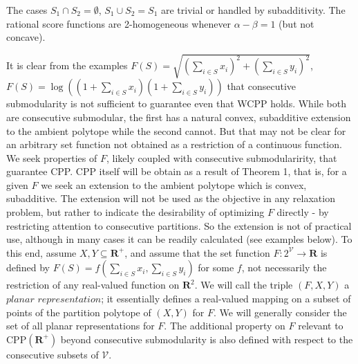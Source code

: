 \documentclass{article}
\theoremstyle{case}
\begin{document}
The cases $S_1 \cap S_2 = \emptyset$, $S_1 \cup S_2 = S_1$ are trivial or handled by subadditivity. The rational score functions are 2-homogeneous whenever $\alpha - \beta = 1$ (but not concave). 

It is clear from the examples $F(S) = \sqrt{(\sum_{i \in S}x_i)^2 + (\sum_{i \in S}y_i)^2}$, $F(S) = \log{((1+\sum_{i \in S}x_i)(1+\sum_{i \in S}y_i))}$ that consecutive submodularity is not sufficient to guarantee even that WCPP holds. While both are consecutive submodular, the first has a natural convex, subadditive extension to the ambient polytope while the second cannot. But that may not be clear for an arbitrary set function not obtained as a restriction of a continuous function. We seek properties of $F$, likely coupled with consecutive submodularirity, that guarantee CPP. CPP itself will be obtain as a result of Theorem 1, that is, for a given $F$ we seek an extension to the ambient polytope which is convex, subadditive. The extension will not be used as the objective in any relaxation problem, but rather to indicate the desirability of optimizing $F$ directly - by restricting attention to consecutive partitions. So the extension is not of practical use, although in many cases it can be readily calculated (see examples below). 
To this end, assume $X, Y \subseteq \mathbf{R}^+$, and assume that the set function $F\colon 2^{\mathcal{V}} \to \mathbf{R}$ is defined by $F(S) = f(\sum_{i \in S}x_i,\sum_{i \in S}y_i)$ for some $f$, not necessarily the restriction of any real-valued function on $\mathbf{R}^2$. We will call the triple $(F, X, Y)$ a $\textit{planar representation}$; it essentially defines a real-valued mapping on a subset of points of the partition polytope of $(X, Y)$ for $F$. We will generally consider the set of all planar representations for $F$. The additional property on $F$ relevant to CPP$(\mathbf{R}^+)$ beyond consecutive submodularity is also defined with respect to the consecutive subsets of $\mathcal{V}$.
\end{document}
